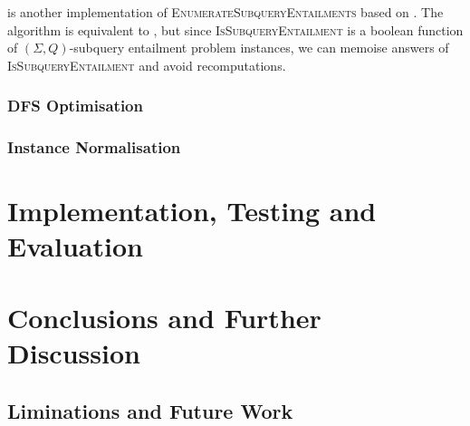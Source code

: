 \documentclass[12pt]{report}
\theoremstyle{plain}
\theoremstyle{definition}
\begin{document}
 is another implementation of \nobreak\textsc{EnumerateSubqueryEntailments} based on . The algorithm is equivalent to , but since \textsc{IsSubqueryEntailment} is a boolean function of $(\Sigma, Q)$-subquery entailment problem instances, we can memoise answers of \textsc{IsSubqueryEntailment} and avoid recomputations.

\subsection{DFS Optimisation}
\label{subsection:dfs-optimisation}


\subsection{Instance Normalisation}
\label{subsection:instance-normalisation}


\newpage
\chapter{Implementation, Testing and Evaluation}




\newpage
\chapter{Conclusions and Further Discussion}

\section{Liminations and Future Work}
\label{section:limitations-and-future-work}


\printbibliography
\end{document}
